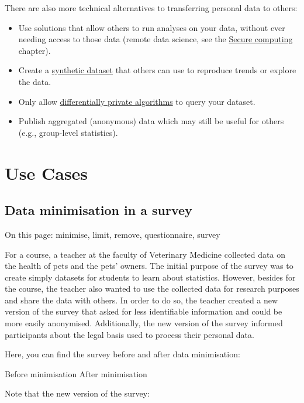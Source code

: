 \documentclass[
]{book}
\providecommand{\tightlist}{%
  \setlength{\itemsep}{0pt}\setlength{\parskip}{0pt}}
\begin{document}
There are also more technical alternatives to transferring personal data to others:

\begin{itemize}
\tightlist
\item
  Use solutions that allow others to run analyses on your data, without ever
  needing access to those data (remote data science, see the
  \protect\hyperlink{secure-computation}{Secure computing} chapter).
\item
  Create a \protect\hyperlink{synthetic-data}{synthetic dataset} that others can use to reproduce
  trends or explore the data.
\item
  Only allow \protect\hyperlink{differential-privacy}{differentially private algorithms} to query
  your dataset.
\item
  Publish aggregated (anonymous) data which may still be useful for others
  (e.g., group-level statistics).
\end{itemize}

\hypertarget{part-use-cases}{%
\part*{Use Cases}\label{part-use-cases}}

\hypertarget{pet-survey}{%
\chapter{Data minimisation in a survey}\label{pet-survey}}

On this page: minimise, limit, remove, questionnaire, survey

For a course, a teacher at the faculty of Veterinary Medicine collected data on
the health of pets and the pets' owners. The initial purpose of the survey was
to create simply datasets for students to learn about statistics. However,
besides for the course, the teacher also wanted to use the collected data for
research purposes and share the data with others. In order to do so, the teacher
created a new version of the survey that asked for less identifiable information
and could be more easily anonymised. Additionally, the new version of the survey
informed participants about the legal basis used to process their personal data.

Here, you can find the survey before and after data minimisation:

Before minimisation
After minimisation

Note that the new version of the survey:
\end{document}
